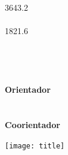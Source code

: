 \documentclass[11pt]{article}
\makeatletter
\newcommand\HUGE{\@setfontsize\Huge{36}{43.2}}
\newcommand\LargeA{\@setfontsize\Large{18}{21.6}}
\makeatother
\begin{document}
\pagestyle{empty}
\setlength{\parindent}{0cm}





\hspace{25mm}
\begin{minipage}[b][297mm][t]{125mm}
	\vfill
	\parbox[t][200mm][t]{125mm}{
		\raggedright
		{\HUGE \bfseries \fronttitle} \\
		 {\large~\\}
		{\LargeA \authorname \\} 
		{\large \coursename \\}
		{\small \deptname \\ \the\year \\}
		{\small~\\}
		{\large \bfseries Orientador \\}
		{\small \supervisor \\}
		{\small~\\}
		{\large \bfseries Coorientador \\}
		{\small \cosupervisor}
	}
\end{minipage}
\hfill
\begin{minipage}[b][297mm][b]{54.3mm}
	\texttt{[image: title]}
\end{minipage}

\newpage



\end{document}
